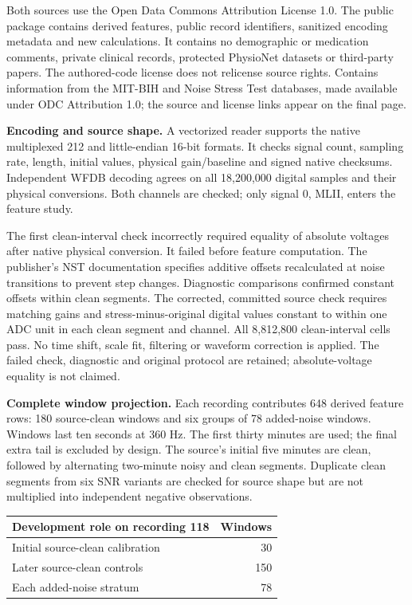\documentclass[10pt,letterpaper]{article}
\begin{document}
Both sources use the Open Data Commons Attribution License 1.0. The public package contains derived features, public record identifiers, sanitized encoding metadata and new calculations. It contains no demographic or medication comments, private clinical records, protected PhysioNet datasets or third-party papers. The authored-code license does not relicense source rights. Contains information from the MIT-BIH and Noise Stress Test databases, made available under ODC Attribution 1.0; the source and license links appear on the final page.

\textbf{Encoding and source shape.} A vectorized reader supports the native multiplexed 212 and little-endian 16-bit formats. It checks signal count, sampling rate, length, initial values, physical gain/baseline and signed native checksums. Independent WFDB decoding agrees on all 18,200,000 digital samples and their physical conversions. Both channels are checked; only signal 0, MLII, enters the feature study.

The first clean-interval check incorrectly required equality of absolute voltages after native physical conversion. It failed before feature computation. The publisher's NST documentation specifies additive offsets recalculated at noise transitions to prevent step changes. Diagnostic comparisons confirmed constant offsets within clean segments. The corrected, committed source check requires matching gains and stress-minus-original digital values constant to within one ADC unit in each clean segment and channel. All 8,812,800 clean-interval cells pass. No time shift, scale fit, filtering or waveform correction is applied. The failed check, diagnostic and original protocol are retained; absolute-voltage equality is not claimed.

\textbf{Complete window projection.} Each recording contributes 648 derived feature rows: 180 source-clean windows and six groups of 78 added-noise windows. Windows last ten seconds at 360 Hz. The first thirty minutes are used; the final extra tail is excluded by design. The source's initial five minutes are clean, followed by alternating two-minute noisy and clean segments. Duplicate clean segments from six SNR variants are checked for source shape but are not multiplied into independent negative observations.

\begin{center}\begin{tabular}{@{}lr@{}}\toprule
Development role on recording 118 & Windows\\\midrule
Initial source-clean calibration & 30\\
Later source-clean controls & 150\\
Each added-noise stratum & 78\\
\bottomrule\end{tabular}\end{center}
\end{document}
